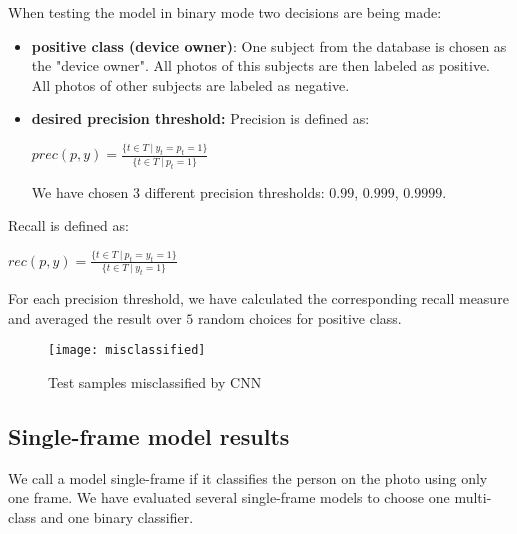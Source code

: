         When testing the model in binary mode two decisions are being made:
        \begin{itemize}
            \item \textbf{positive class (device owner)}: One subject from the
            database is chosen as the "device owner". All photos of this subjects
            are then labeled as positive. All photos of other subjects are
            labeled as negative.
            \item \textbf{desired precision threshold:}
            Precision is defined as:
            \begin{center}
            $prec(p, y) = \frac{\{t \in T\ |\ y_t = p_t = 1\}}{\{t \in T\ |\ p_t = 1\}}$
            \end{center}
            We have chosen $3$ different precision thresholds: $0.99$, $0.999$, $0.9999$.
        \end{itemize}
        Recall is defined as:
        \begin{center}
        $rec(p, y) = \frac{\{t \in T\ |\ p_t = y_t = 1\}}{\{t \in T\ |\ y_t = 1\}}$
        \end{center}
        For each precision threshold, we have calculated the corresponding recall measure and
        averaged the result over $5$ random choices for positive class.

    \begin{figure}[H]
    \caption{Test samples misclassified by CNN}
    \centering
    \texttt{[image: misclassified]}
    \end{figure}


    \subsection{Single-frame model results}
        We call a model single-frame if it classifies the person on the photo
        using only one frame. We have evaluated several single-frame models to
        choose one multi-class and one binary classifier.
